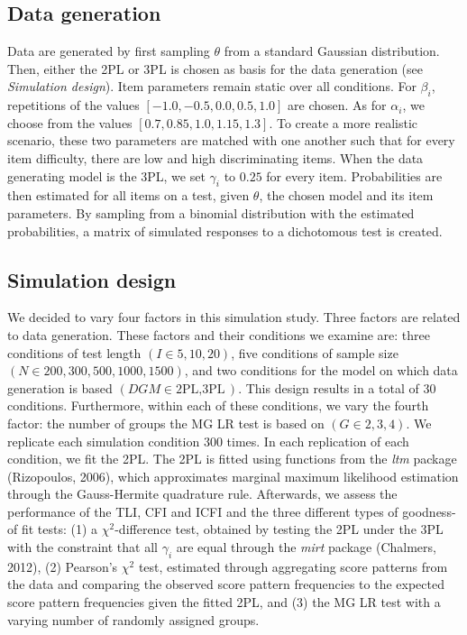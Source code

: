 \documentclass[Royal,sageapa,times,doublespace]{sagej}
\begin{document}
\subsection{Data generation}
Data are generated by first sampling $\theta$ from a standard Gaussian distribution. Then, either the 2PL or 3PL is chosen as basis for the data generation (see \textit{Simulation design}). Item parameters remain static over all conditions. For $\beta_i$, repetitions of the values $[-1.0, -0.5, 0.0, 0.5, 1.0]$ are chosen. As for $\alpha_i$, we choose from the values $[0.7, 0.85, 1.0, 1.15, 1.3]$. To create a more realistic scenario, these two parameters are matched with one another such that for every item difficulty, there are low and high discriminating items. When the data generating model is the 3PL, we set $\gamma_i$ to $0.25$ for every item. Probabilities are then estimated for all items on a test, given $\theta$, the chosen model and its item parameters. By sampling from a binomial distribution with the estimated probabilities, a matrix of simulated responses to a dichotomous test is created.
\subsection{Simulation design}
We decided to vary four factors in this simulation study. Three factors are related to data generation. These factors and their conditions we examine are: three conditions of test length $(I \in{5,10,20})$, five conditions of sample size $(N \in{200, 300, 500, 1000, 1500})$, and two conditions for the model on which data generation is based $(DGM \in{\text{2PL}, \text{3PL}})$. This design results in a total of $30$ conditions. Furthermore, within each of these conditions, we vary the fourth factor: the number of groups the MG LR test is based on $(G \in{2, 3, 4})$. We replicate each simulation condition 300 times. In each replication of each condition, we fit the 2PL. The 2PL is fitted using functions from the \textit{ltm} package (Rizopoulos, 2006), which approximates marginal maximum likelihood estimation through the Gauss-Hermite quadrature rule. Afterwards, we assess the performance of the TLI, CFI and ICFI and the three different types of goodness-of fit tests: (1) a $\chi^2$-difference test, obtained by testing the 2PL under the 3PL with the constraint that all $\gamma_i$ are equal through the \textit{mirt} package (Chalmers, 2012), (2) Pearson's $\chi^2$ test, estimated through aggregating score patterns from the data and comparing the observed score pattern frequencies to the expected score pattern frequencies given the fitted 2PL, and (3) the MG LR test with a varying number of randomly assigned groups. 
\end{document}

